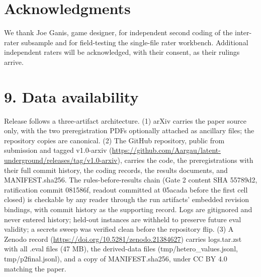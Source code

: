 \documentclass[11pt]{article}
\begin{document}
\section*{Acknowledgments}

We thank Joe Ganis, game designer, for independent second coding of the
inter-rater subsample and for field-testing the single-file rater
workbench. Additional independent raters will be acknowledged, with
their consent, as their rulings arrive.

\section*{9. Data availability}

Release follows a three-artifact architecture. (1) arXiv carries the
paper source only, with the two preregistration PDFs optionally attached
as ancillary files; the repository copies are canonical. (2) The GitHub
repository, public from submission and tagged v1.0-arxiv (\url{https://github.com/Aargau/latent-underground/releases/tag/v1.0-arxiv}), carries the code, the preregistrations with their full
commit history, the coding records, the results documents, and
MANIFEST.sha256. The rules-before-results chain (Gate 2 content SHA
55789d2, ratification commit 081586f, readout committed at 05acada
before the first cell closed) is checkable by any reader through the run
artifacts' embedded revision bindings, with commit history as the
supporting record. Logs are gitignored and never entered history;
held-out instances are withheld to preserve future eval validity; a
secrets sweep was verified clean before the repository flip. (3) A
Zenodo record (\url{https://doi.org/10.5281/zenodo.21384627}) carries logs.tar.zst with all .eval
files (47 MB), the derived-data files (tmp/hetero\_values.jsonl,
tmp/p2final.jsonl), and a copy of MANIFEST.sha256, under CC BY 4.0
matching the paper.
\end{document}
